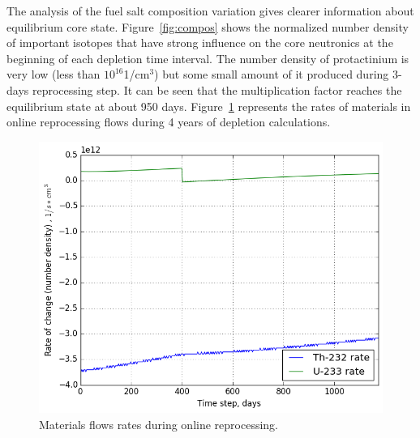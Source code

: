 \documentclass{anstrans}
\begin{document}
The analysis of the fuel salt composition variation gives clearer information 
about equilibrium core state. Figure~\ref{fig:compos} shows the normalized 
number density of important isotopes that have strong influence on the core 
neutronics at the beginning of each depletion time interval. The number density 
of protactinium is very low (less than $10^{16}$1/cm$^3$) but some small amount 
of it produced during 3-days reprocessing step. It can be seen that the 
multiplication factor reaches the equilibrium state at about 950  days. 
Figure~\ref{fig:rates} represents the rates of materials in online reprocessing 
flows during 4 years of depletion calculations. 
\begin{figure}[htbp!] %
        \centering
        \includegraphics[width=1.03\linewidth]{rates_fuel.png}
        \caption{Materials flows rates during online reprocessing.}
        \label{fig:rates}
\end{figure}
\end{document}
